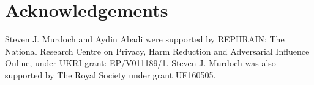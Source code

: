 

\section*{Acknowledgements}

Steven J. Murdoch and Aydin Abadi were supported by REPHRAIN: The National Research Centre on Privacy, Harm Reduction and Adversarial Influence Online, under UKRI grant: EP/V011189/1. Steven J. Murdoch was also supported by The Royal Society under grant UF160505. 
